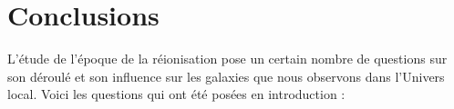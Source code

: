 
\chapter{Conclusions}


L'étude de l'époque de la réionisation pose un certain nombre de questions sur son déroulé et son influence sur les galaxies que nous observons dans l'Univers local.
Voici les questions qui ont été posées en introduction :
%
%
%
%
%
%
%
%
%
%



